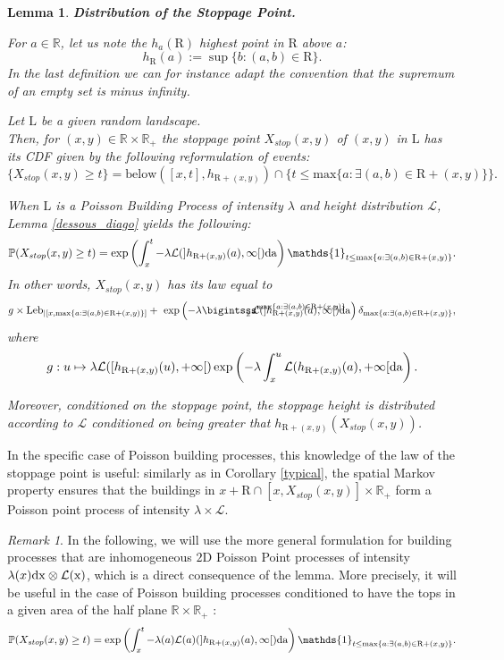 \documentclass[10pt,english,a4paper]{smfart}
\newtheorem{lemma}{Lemma}[theorem]
\theoremstyle{definition}
\theoremstyle{remark}
\newtheorem{remark}{Remark}
\newcommand{\R}{\mathbb{R}}
\newcommand{\Leb}{\mathrm{Leb}}
\newcommand{\landsc}{\mathrm{L}}
\newcommand{\Half}{\R \times \R_+}
\newcommand{\p}{\mathbb{P}}
\renewcommand{\max}{\text{max}}
\begin{document}
\begin{lemma}\textbf{Distribution of the Stoppage Point.}\label{dist_stop}

For $a\in \R$, let us note the $h_a(\mathrm{R})$ highest point in $\mathrm{R}$ above $a$:
\[h_{\mathrm{R}}(a):= \sup \{b: (a, b)\in \mathrm{R}\}.\]
In the last definition we can for instance adapt the convention that the supremum of an empty set is minus infinity.

Let $\landsc$ be a given random landscape.\\
Then, for $(x, y) \in \Half$ the stoppage point $X_{stop}(x, y)$ of $(x, y)$ in $\landsc$ has its CDF given by the following reformulation of events:
\[\{X_{stop}(x, y) \geq t\} =  \mathrm{below}([x, t],h_{\mathrm{R}+(x, y)})\cap \{t\leq\max\{a : \exists (a, b)\in \mathrm{R}+(x, y)\}\} .\]

When $\landsc$ is a Poisson Building Process of intensity $\lambda$ and height distribution $\mathcal{L}$, Lemma \ref{dessous_diago} yields the following:
\[\p (X_{stop}(x, y) \geq t) = \exp \left(\int_{x}^{t} -\lambda \mathcal{L}(]h_{\mathrm{R}+(x, y)}(a), \infty[) \rm{d}a \right)\mathds{1}_{t \leq \max\{a : \exists (a, b)\in \mathrm{R}+(x, y)\}} .\]
In other words, $X_{stop}(x, y)$ has its law equal to
\[g\times\Leb_{|[x,\max\{a : \exists (a, b)\in \mathrm{R}+(x, y)\}]}+ \ \exp \left(-\lambda\bigintsss_{\hspace{-10pt}x}^{\max\{a : \exists (a, b)\in \mathrm{R}+(x, y)\}} \hspace{-90pt} \mathcal{L}(]h_{\mathrm{R}+(x, y)}(a), \infty[) \rm{d}a \right)\delta_{\max\{a : \exists (a, b)\in \mathrm{R}+(x, y)\}},\]
where 
\[g: u\mapsto \lambda \mathcal{L}([h_{\mathrm{R}+(x, y)}(u), +\infty[)\exp\left(-\lambda \int_{x}^{u}\mathcal{L}(h_{\mathrm{R}+(x, y)}(a), +\infty[ \rm{d}a\right).\]

Moreover, conditioned on the stoppage point, the stoppage height is distributed according to $\mathcal{L}$ conditioned on being greater that $h_{\mathrm{R}+(x, y)}(X_{stop}(x, y))$.
\end{lemma}

In the specific case of Poisson building processes, this knowledge of the law of the stoppage point is useful: similarly as in Corollary \ref{typical}, the spatial Markov property ensures that the buildings in $x+\mathrm{R}\cap [x, X_{stop}(x, y)]\times \R_+$ form a Poisson point process of intensity $\lambda\times \mathcal{L}$.

\begin{remark}
In the following, we will use the more general formulation for building processes that are inhomogeneous $2$D Poisson Point processes of intensity $\lambda(x)\rm{d}x\otimes \mathcal{L}(x)$, which is a direct consequence of the lemma. More precisely, it will be useful in the case of Poisson building processes conditioned to have the tops in a given area of the half plane $\Half$ :
\[\p (X_{stop}(x, y) \geq t) = \exp \left(\int_{x}^{t} -\lambda(a) \mathcal{L}(a)(]h_{\mathrm{R}+(x, y)}(a), \infty[) \rm{d}a \right)\mathds{1}_{t \leq \max\{a : \exists (a, b)\in \mathrm{R}+(x, y)\}} .\]
\end{remark}
\end{document}
